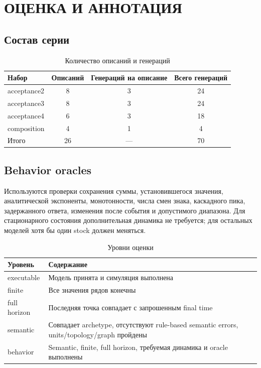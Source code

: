 \chapter{ОЦЕНКА И АННОТАЦИЯ}
\label{app:evaluation}

\section{Состав серии}

\begin{table}[H]
    \centering
    \caption{Количество описаний и генераций}
    \label{tab:case-counts}
    \small
    \begin{tabular}{lccc}
        \toprule
        Набор & Описаний & Генераций на описание & Всего генераций \\
        \midrule
        acceptance2 & 8 & 3 & 24 \\
        acceptance3 & 8 & 3 & 24 \\
        acceptance4 & 6 & 3 & 18 \\
        composition & 4 & 1 & 4 \\
        \midrule
        Итого & 26 & --- & 70 \\
        \bottomrule
    \end{tabular}
\end{table}

\section{Behavior oracles}

Используются проверки сохранения суммы, установившегося значения, аналитической экспоненты, монотонности, числа смен знака, каскадного пика, задержанного ответа, изменения после события и допустимого диапазона. Для стационарного состояния дополнительная динамика не требуется; для остальных моделей хотя бы один stock должен меняться.

\begin{table}[H]
    \centering
    \caption{Уровни оценки}
    \label{tab:metric-levels}
    \small
    \begin{tabularx}{\textwidth}{L{3cm}X}
        \toprule
        Уровень & Содержание \\
        \midrule
        executable & Модель принята и симуляция выполнена \\
        finite & Все значения рядов конечны \\
        full horizon & Последняя точка совпадает с запрошенным final time \\
        semantic & Совпадает archetype, отсутствуют rule-based semantic errors, units/topology/graph пройдены \\
        behavior & Semantic, finite, full horizon, требуемая динамика и oracle выполнены \\
        \bottomrule
    \end{tabularx}
\end{table}

